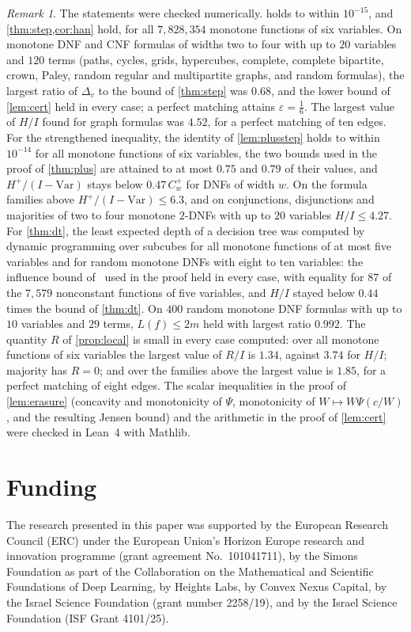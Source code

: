 \documentclass[11pt]{amsart}
\theoremstyle{remark}
\newtheorem{remark}[theorem]{Remark}
\newcommand{\Var}{\mathrm{Var}}
\newcommand{\eps}{\varepsilon}
\begin{document}
\begin{remark}\label{rem:numerics}
The statements were checked numerically.  holds to within $10^{-15}$, and
\cref{thm:step,cor:han} hold, for all $7{,}828{,}354$ monotone functions of six variables. On monotone DNF and CNF
formulas of widths two to four with up to $20$ variables and $120$ terms (paths, cycles, grids, hypercubes, complete,
complete bipartite, crown, Paley, random regular and multipartite graphs, and random formulas), the largest ratio of
$\Delta_v$ to the bound of \cref{thm:step} was $0.68$, and the lower bound of \cref{lem:cert} held in every case; a
perfect matching attains $\eps=\frac16$. The largest value of $H/I$ found for graph formulas was $4.52$, for a
perfect matching of ten edges. For the strengthened inequality, the identity of \cref{lem:plusstep} holds to within
$10^{-14}$ for all monotone functions of six variables, the two bounds used in the proof of \cref{thm:plus} are
attained to at most $0.75$ and $0.79$ of their values, and $H^+/(I-\Var)$ stays below $0.47\,C^+_w$ for DNFs of width
$w$. On the formula families above $H^+/(I-\Var)\le6.3$, and on conjunctions, disjunctions and majorities of two to
four monotone $2$-DNFs with up to $20$ variables $H/I\le4.27$. For \cref{thm:dt}, the least expected depth of a
decision tree was computed by dynamic programming over subcubes for all monotone functions of at most five variables and
for random monotone DNFs with eight to ten variables: the influence bound of~\cite{OSSS05} used in the proof held in
every case, with equality for $87$ of the $7{,}579$ nonconstant functions of five variables, and $H/I$ stayed below
$0.44$ times the bound of \cref{thm:dt}. On $400$ random monotone DNF formulas with up to $10$ variables and $29$
terms, $L(f)\le2m$ held with largest ratio $0.992$. The quantity $R$ of \cref{prop:local} is small in every case computed: over
all monotone functions of six variables the largest value of $R/I$ is $1.34$, against $3.74$ for $H/I$; majority has
$R=0$; and over the families above the largest value is $1.85$, for a perfect matching of eight edges. The scalar
inequalities in the proof of \cref{lem:erasure} (concavity and monotonicity of $\Psi$, monotonicity of
$W\mapsto W\Psi(c/W)$, and the resulting Jensen bound) and the arithmetic in the proof of \cref{lem:cert} were checked
in Lean~4 with Mathlib.
\end{remark}

\section*{Funding}
The research presented in this paper was supported by the European Research Council (ERC) under the European
Union's Horizon Europe research and innovation programme (grant agreement No.~101041711), by the Simons Foundation
as part of the Collaboration on the Mathematical and Scientific Foundations of Deep Learning, by Heights Labs, by
Convex Nexus Capital, by the Israel Science Foundation (grant number 2258/19), and by the Israel Science Foundation
(ISF Grant 4101/25).
\end{document}

